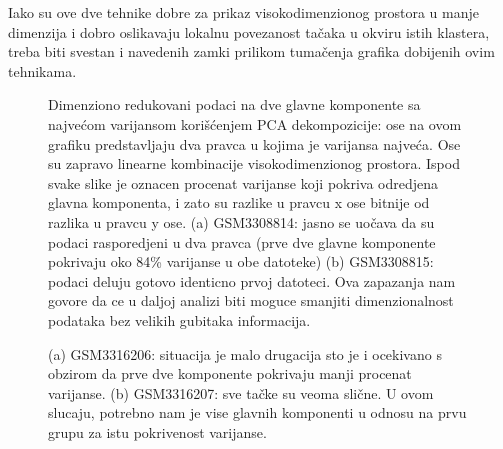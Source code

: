 \documentclass{article}
\begin{document}
Iako su ove dve tehnike dobre za prikaz visokodimenzionog prostora u manje dimenzija i dobro oslikavaju lokalnu povezanost tačaka u okviru istih klastera, treba biti svestan i navedenih zamki prilikom tumačenja grafika dobijenih ovim tehnikama. 

\begin{figure}[!h]
    \centering
    \caption{ Dimenziono redukovani podaci na dve glavne komponente sa najvećom varijansom korišćenjem PCA dekompozicije: ose na ovom grafiku predstavljaju dva pravca u kojima je varijansa najveća. Ose su zapravo linearne kombinacije visokodimenzionog prostora. Ispod svake slike je oznacen procenat varijanse koji pokriva odredjena glavna komponenta, i zato su razlike u pravcu x ose bitnije od razlika u pravcu y ose. (a) GSM3308814: jasno se uočava da su podaci rasporedjeni u dva pravca (prve dve glavne komponente pokrivaju oko 84\% varijanse u obe datoteke) (b) GSM3308815: podaci deluju gotovo identicno prvoj datoteci. Ova zapazanja nam govore da ce u daljoj analizi biti moguce smanjiti dimenzionalnost podataka bez velikih gubitaka informacija. }
    \label{fig:pca_HVG_group_1}
\end{figure}

\begin{figure}[!h]
    \centering
    \caption{ (a) GSM3316206: situacija je malo drugacija sto je i ocekivano s obzirom da prve dve komponente pokrivaju manji procenat varijanse. (b) GSM3316207: sve tačke su veoma slične. U ovom slucaju, potrebno nam je vise glavnih komponenti u odnosu na prvu grupu za istu pokrivenost varijanse. }
    \label{fig:pca_HVG_group_2}
\end{figure}
\end{document}
